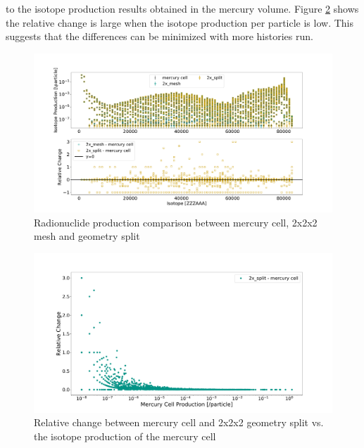 to the isotope production results obtained in the mercury volume.
Figure \ref{fig:1prod_cell_2x_rc} shows the relative change is large when the
isotope production per particle is low. This suggests that the differences can
be minimized with more histories run.
%
\begin{figure}[H]
	\centering
	\includegraphics[scale=0.4,trim={2cm 1cm 3cm 2cm},clip]{../figs/toy_p1/prod_VPI_2x.pdf}
	\caption{Radionuclide production comparison between mercury cell, 2x2x2 mesh and geometry split}
	\label{fig:1prod_cell_2x}
\end{figure}
%
\begin{figure}[H]
	\centering
	\includegraphics[scale=0.35,trim={3cm 0.5cm 4.5cm 3cm},clip]{../figs/toy_p1/prod_VPI_rc_2x_split.pdf}
	\caption{Relative change between mercury cell and 2x2x2 geometry split vs. the isotope production of the mercury cell}
	\label{fig:1prod_cell_2x_rc}
\end{figure}

